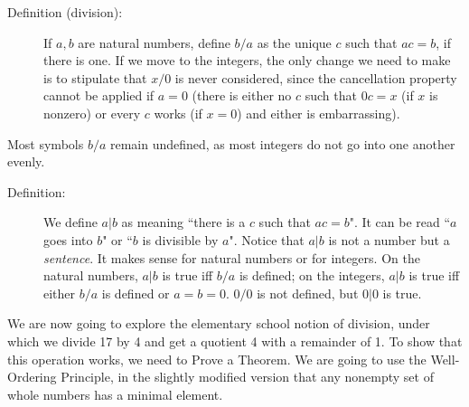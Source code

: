 \documentclass[12pt]{article}
\begin{document}
\begin{description}
\item[Definition (division):]   If $a,b$ are natural numbers, define $b/a$ as the unique $c$ such that $ac=b$, if there is one. If we move to the integers, the only
change we need to make is to stipulate that $x/0$ is never considered, since the cancellation property cannot be applied if $a=0$ (there is either no $c$ such that $0c=x$ (if $x$ is nonzero) or every $c$ works (if $x=0$) and either is embarrassing).
\end{description}

Most symbols $b/a$ remain undefined, as most integers do not go into one another evenly.

\begin{description}

\item[Definition:]  We define $a|b$ as meaning ``there is a $c$ such that $ac=b$".  It can be read ``$a$ goes into $b$" or
``$b$ is divisible by $a$".  Notice that $a|b$ is not a number but a {\em sentence\/}.   It makes sense for natural numbers or for integers.   On the natural numbers, $a|b$ is true iff $b/a$ is defined; on the integers, 
$a|b$ is true iff either $b/a$ is defined or $a=b=0$.  $0/0$ is not defined, but $0|0$ is true.

\end{description}

We are now going to explore the elementary school notion of division, under which we divide 17 by 4 and
get a quotient 4 with a remainder of 1.   To show that this operation works, we need to Prove a Theorem.
We are going to use the Well-Ordering Principle, in the slightly modified version that any nonempty set of whole numbers has a minimal element.
\end{document}
